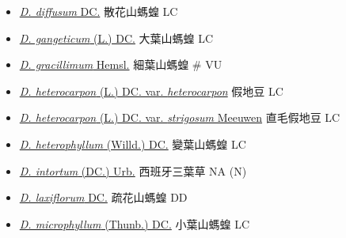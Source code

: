 \begin{itemize}
  \begin{itemize}
        \item[] \href{http://www.theplantlist.org/tpl1.1/search?q=Desmodium+diffusum}{\textit{D. diffusum} DC.}   散花山螞蝗   LC
        \item[] \href{http://www.theplantlist.org/tpl1.1/search?q=Desmodium+gangeticum}{\textit{D. gangeticum} (L.) DC.}   大葉山螞蝗   LC
        \item[] \href{http://www.theplantlist.org/tpl1.1/search?q=Desmodium+gracillimum}{\textit{D. gracillimum} Hemsl.}   細葉山螞蝗  \# VU
        \item[] \href{http://www.theplantlist.org/tpl1.1/search?q=Desmodium+heterocarpon+var.+heterocarpon}{\textit{D. heterocarpon} (L.) DC. var. \textit{heterocarpon}}   假地豆   LC
        \item[] \href{http://www.theplantlist.org/tpl1.1/search?q=Desmodium+heterocarpon+var.+strigosum}{\textit{D. heterocarpon} (L.) DC. var. \textit{strigosum} Meeuwen}   直毛假地豆   LC
        \item[] \href{http://www.theplantlist.org/tpl1.1/search?q=Desmodium+heterophyllum}{\textit{D. heterophyllum} (Willd.) DC.}   變葉山螞蝗   LC
        \item[] \href{http://www.theplantlist.org/tpl1.1/search?q=Desmodium+intortum}{\textit{D. intortum} (DC.) Urb.}   西班牙三葉草   NA (N)
        \item[] \href{http://www.theplantlist.org/tpl1.1/search?q=Desmodium+laxiflorum}{\textit{D. laxiflorum} DC.}   疏花山螞蝗   DD
        \item[] \href{http://www.theplantlist.org/tpl1.1/search?q=Desmodium+microphyllum}{\textit{D. microphyllum} (Thunb.) DC.}   小葉山螞蝗   LC

\end{itemize}
\end{itemize}
